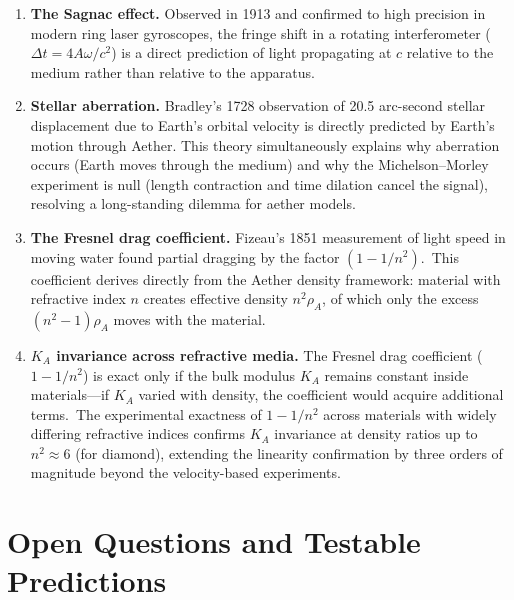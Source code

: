﻿\documentclass[12pt,letterpaper]{article}
\newcommand{\rhoa}{\rho_{\!A}}
\newcommand{\Ka}{K_{\!A}}
\begin{document}
\begin{enumerate}[leftmargin=2em]
  \item \textbf{The Sagnac effect.} Observed in 1913 \cite{sagnac1913} and confirmed to high precision in modern ring
    laser gyroscopes, the fringe shift in a rotating interferometer
    ($\Delta t = 4A\omega/c^2$) is a direct prediction of light propagating at $c$ relative
    to the medium rather than relative to the apparatus.

  \item \textbf{Stellar aberration.} Bradley's 1728 observation \cite{bradley1728} of 20.5 arc-second stellar displacement
    due to Earth's orbital velocity is directly predicted by Earth's motion through Aether.
    This theory simultaneously explains why aberration occurs (Earth moves through the
    medium) and why the Michelson--Morley experiment is null (length contraction and time
    dilation cancel the signal), resolving a long-standing dilemma for aether models.

  \item \textbf{The Fresnel drag coefficient.} Fizeau's 1851 measurement \cite{fizeau1851} of light speed in moving water
    found partial dragging by the factor $(1 - 1/n^2)$.\ This coefficient derives directly
    from the Aether density framework: material with refractive index $n$ creates effective
    density $n^2 \rhoa$, of which only the excess $(n^2 - 1)\rhoa$ moves with the
    material.

  \item \textbf{$\Ka$ invariance across refractive media.} The Fresnel drag coefficient ($1 - 1/n^2$) is
    exact only if the bulk modulus $\Ka$ remains constant inside materials---if $\Ka$ varied
    with density, the coefficient would acquire additional terms.\ The experimental exactness
    of $1 - 1/n^2$ across materials with widely differing refractive indices confirms $\Ka$
    invariance at density ratios up to $n^2 \approx 6$ (for diamond), extending the linearity
    confirmation by three orders of magnitude beyond the velocity-based experiments.

\end{enumerate}



\section{Open Questions and Testable Predictions}
\end{document}
